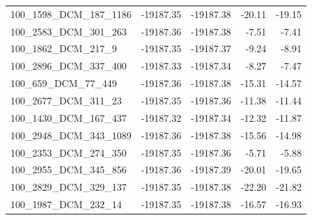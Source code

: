 \documentclass[journal=jacsat,manuscript=article]{achemso}
\begin{document}
\begin{table}[b!]
\begin{tabular}{lrrrr}
100\_1598\_DCM\_187\_1186 & -19187.35 & -19187.38 &  -20.11 & -19.15 \\
100\_2583\_DCM\_301\_263  & -19187.36 & -19187.38 &   -7.51 &  -7.41 \\
100\_1862\_DCM\_217\_9    & -19187.35 & -19187.37 &   -9.24 &  -8.91 \\
100\_2896\_DCM\_337\_400  & -19187.33 & -19187.34 &   -8.27 &  -7.47 \\
100\_659\_DCM\_77\_449    & -19187.36 & -19187.38 &  -15.31 & -14.57 \\
100\_2677\_DCM\_311\_23   & -19187.35 & -19187.36 &  -11.38 & -11.44 \\
100\_1430\_DCM\_167\_437  & -19187.32 & -19187.34 &  -12.32 & -11.87 \\
100\_2948\_DCM\_343\_1089 & -19187.36 & -19187.38 &  -15.56 & -14.98 \\
100\_2353\_DCM\_274\_350  & -19187.35 & -19187.36 &   -5.71 &  -5.88 \\
100\_2955\_DCM\_345\_856  & -19187.36 & -19187.39 &  -20.01 & -19.65 \\
100\_2829\_DCM\_329\_137  & -19187.35 & -19187.38 &  -22.20 & -21.82 \\
100\_1987\_DCM\_232\_14   & -19187.35 & -19187.38 &  -16.57 & -16.93 \\
\bottomrule
\end{tabular}
\end{table}
\end{document}
